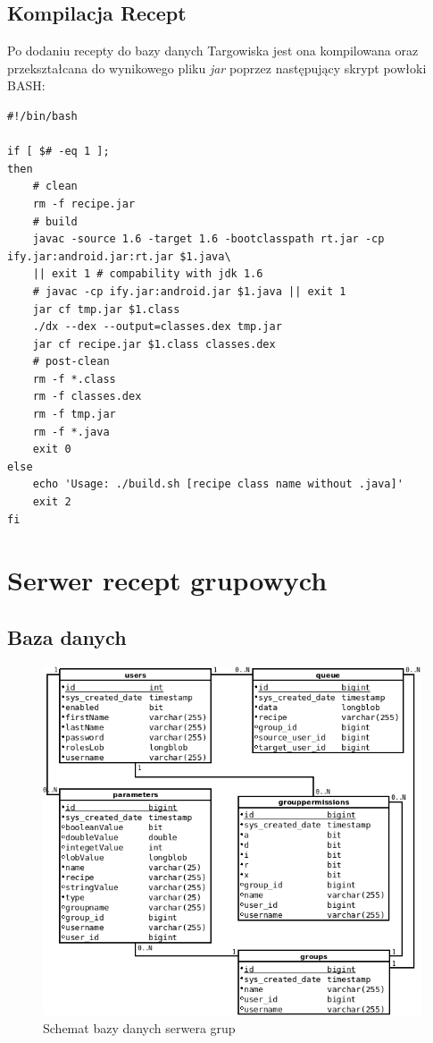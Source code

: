 \documentclass[11pt,a4paper,polish,thesis]{dcsbook}
\begin{document}
\subsection{Kompilacja Recept}
Po dodaniu recepty do bazy danych Targowiska jest ona kompilowana oraz przekształcana do wynikowego pliku \emph{jar} poprzez następujący skrypt powłoki BASH:
\begin{verbatim}
#!/bin/bash

if [ $# -eq 1 ];
then
    # clean
    rm -f recipe.jar
    # build
    javac -source 1.6 -target 1.6 -bootclasspath rt.jar -cp ify.jar:android.jar:rt.jar $1.java\
    || exit 1 # compability with jdk 1.6
    # javac -cp ify.jar:android.jar $1.java || exit 1
    jar cf tmp.jar $1.class
    ./dx --dex --output=classes.dex tmp.jar
    jar cf recipe.jar $1.class classes.dex
    # post-clean
    rm -f *.class
    rm -f classes.dex
    rm -f tmp.jar
    rm -f *.java
    exit 0
else
    echo 'Usage: ./build.sh [recipe class name without .java]'
    exit 2
fi
\end{verbatim}
\section{Serwer recept grupowych}
\subsection{Baza danych}
\begin{figure}[H]
  \centering
  \includegraphics[scale=0.7]{./resources/server_db.png}
  \caption{Schemat bazy danych serwera grup}
  \label{fig:server_db}
\end{figure}
\end{document}
